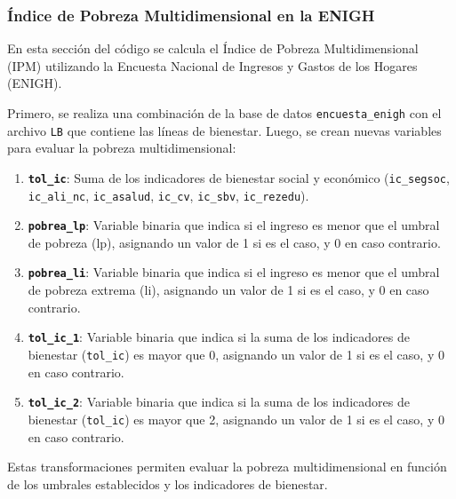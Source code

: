 \documentclass[
  12pt,
]{book}
\providecommand{\tightlist}{%
  \setlength{\itemsep}{0pt}\setlength{\parskip}{0pt}}
\begin{document}
\hypertarget{uxedndice-de-pobreza-multidimensional-en-la-enigh}{%
\subsubsection*{Índice de Pobreza Multidimensional en la ENIGH}\label{uxedndice-de-pobreza-multidimensional-en-la-enigh}}

En esta sección del código se calcula el Índice de Pobreza Multidimensional (IPM) utilizando la Encuesta Nacional de Ingresos y Gastos de los Hogares (ENIGH).

Primero, se realiza una combinación de la base de datos \texttt{encuesta\_enigh} con el archivo \texttt{LB} que contiene las líneas de bienestar. Luego, se crean nuevas variables para evaluar la pobreza multidimensional:

\begin{enumerate}
\def\labelenumi{\arabic{enumi}.}
\tightlist
\item
  \textbf{\texttt{tol\_ic}}: Suma de los indicadores de bienestar social y económico (\texttt{ic\_segsoc}, \texttt{ic\_ali\_nc}, \texttt{ic\_asalud}, \texttt{ic\_cv}, \texttt{ic\_sbv}, \texttt{ic\_rezedu}).
\item
  \textbf{\texttt{pobrea\_lp}}: Variable binaria que indica si el ingreso es menor que el umbral de pobreza (lp), asignando un valor de 1 si es el caso, y 0 en caso contrario.
\item
  \textbf{\texttt{pobrea\_li}}: Variable binaria que indica si el ingreso es menor que el umbral de pobreza extrema (li), asignando un valor de 1 si es el caso, y 0 en caso contrario.
\item
  \textbf{\texttt{tol\_ic\_1}}: Variable binaria que indica si la suma de los indicadores de bienestar (\texttt{tol\_ic}) es mayor que 0, asignando un valor de 1 si es el caso, y 0 en caso contrario.
\item
  \textbf{\texttt{tol\_ic\_2}}: Variable binaria que indica si la suma de los indicadores de bienestar (\texttt{tol\_ic}) es mayor que 2, asignando un valor de 1 si es el caso, y 0 en caso contrario.
\end{enumerate}

Estas transformaciones permiten evaluar la pobreza multidimensional en función de los umbrales establecidos y los indicadores de bienestar.
\end{document}
